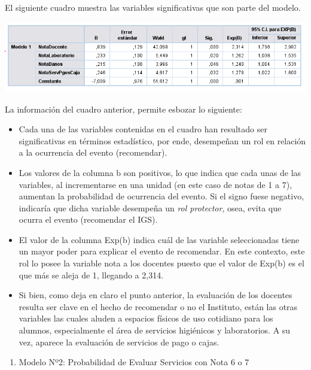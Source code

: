 \documentclass[]{book}
\providecommand{\tightlist}{%
  \setlength{\itemsep}{0pt}\setlength{\parskip}{0pt}}
\begin{document}
El siguiente cuadro muestra las variables significativas que son parte
del modelo.

\begin{center}\includegraphics{images/Modelo1} \end{center}

La información del cuadro anterior, permite esbozar lo siguiente:

\begin{itemize}
\item
  Cada una de las variables contenidas en el cuadro han resultado ser
  significativas en términos estadístico, por ende, desempeñan un rol en
  relación a la ocurrencia del evento (recomendar).
\item
  Los valores de la columna b son positivos, lo que indica que cada unas
  de las variables, al incrementarse en una unidad (en este caso de
  notas de 1 a 7), aumentan la probabilidad de ocurrencia del evento. Si
  el signo fuese negativo, indicaría que dicha variable desempeña un
  \emph{rol protector}, osea, evita que ocurra el evento (recomendar el
  IGS).
\item
  El valor de la columna Exp(b) indica cuál de las variable
  seleccionadas tiene un mayor poder para explicar el evento de
  recomendar. En este contexto, este rol lo posee la variable nota a los
  docentes puesto que el valor de Exp(b) es el que más se aleja de 1,
  llegando a 2,314.
\item
  Si bien, como deja en claro el punto anterior, la evaluación de los
  docentes resulta ser clave en el hecho de recomendar o no el
  Instituto, están las otras variables las cuales aluden a espacios
  físicos de uso cotidiano para los alumnos, especialmente el área de
  servicios higiénicos y laboratorios. A su vez, aparece la evaluación
  de servicios de pago o cajas.
\end{itemize}

\begin{enumerate}
\def\labelenumi{\alph{enumi})}
\setcounter{enumi}{1}
\tightlist
\item
  Modelo Nº2: Probabilidad de Evaluar Servicios con Nota 6 o 7
\end{enumerate}
\end{document}
